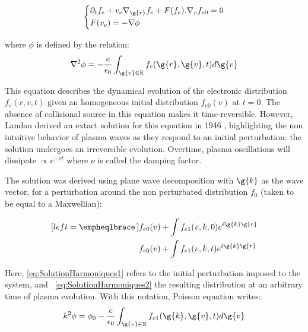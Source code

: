 \begin{equation}
\label{eq:Vlasov}
  \left\{
      \begin{aligned}
     &\partial_{t} f_e + v_e \nabla_{\g{r}} f_e + F(f_e).\nabla_{v}f_{e0} = 0\\
     & F(v_e) = -\nabla \phi\\
      \end{aligned}
    \right.
\end{equation}

\noindent where $\phi$ is defined by the relation:
\begin{equation}
\nabla^2 \phi = -\frac{e}{\epsilon_0}\int_{\g{v}\in \mathbb{R}}f_{e}(\g{r},\g{v},t)d\g{v}
\end{equation}


\noindent This equation describes the dynamical evolution of the electronic distribution $f_e(r,v,t)$ given an homogeneous initial distribution $f_{e0}(v)$  at $t=0$. The absence of collisional source in this equation makes it time-reversible. However, Landau derived an extact solution for this equation in 1946 \cite{landau1946vibrations}, highlighting the non intuitive behavior of plasma waves as they respond to an initial perturbation: the solution undergoes an irreversible evolution. Overtime, plasma oscillations will dissipate $\propto e^{-\nu t}$ where $\nu$ is called the damping factor.

\noindent The solution was derived using plane wave decomposition with $\g{k}$ as the wave vector, for a perturbation around the non perturbated distribution $f_0$ (taken to be equal to a Maxwellian):

\begin{subequations}
\label{eq:SolutionHarmoniques}
\begin{align}[left = \empheqlbrace\,]
&f_{e0}(v) + \int f_{e1}(v,k,0)e^{i\g{k}\g{r}}\label{eq:SolutionHarmoniques1}\\
&f_{e0}(v) + \int f_{e1}(v,k,t)e^{i\g{k}\g{r}}\label{eq:SolutionHarmoniques2}
\end{align}
\end{subequations}


\noindent  Here, \ref{eq:SolutionHarmoniques1} refers to the initial perturbation imposed to the system, and ~\ref{eq:SolutionHarmoniques2} the resulting distribution at an arbitrary time of plasma evolution. With this notation, Poisson equation writes:
\begin{equation}
k^2 \phi = \phi_0 -\frac{e}{\epsilon_0}\int_{\g{v}\in \mathbb{R}}f_{e1}(\g{k},\g{v},t)d\g{v}
\end{equation}


